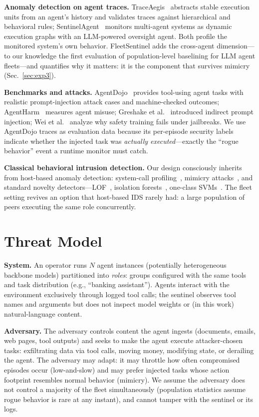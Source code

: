 \documentclass[conference]{IEEEtran}
\newcommand{\sys}{FleetSentinel}
\begin{document}
\textbf{Anomaly detection on agent traces.} TraceAegis~\cite{traceaegis2025} abstracts stable execution units from an agent's history and validates traces against hierarchical and behavioral rules; SentinelAgent~\cite{sentinelagent2025} monitors multi-agent systems as dynamic execution graphs with an LLM-powered oversight agent. Both profile the monitored system's own behavior. \sys{} adds the cross-agent dimension---to our knowledge the first evaluation of population-level baselining for LLM agent fleets---and quantifies why it matters: it is the component that survives mimicry (Sec.~\ref{sec:exp3}).

\textbf{Benchmarks and attacks.} AgentDojo~\cite{debenedetti2024agentdojo} provides tool-using agent tasks with realistic prompt-injection attack cases and machine-checked outcomes; AgentHarm~\cite{andriushchenko2025agentharm} measures agent misuse; Greshake et al.~\cite{greshake2023} introduced indirect prompt injection; Wei et al.~\cite{wei2023jailbroken} analyze why safety training fails under jailbreaks. We use AgentDojo traces as evaluation data because its per-episode security labels indicate whether the injected task was \emph{actually executed}---exactly the ``rogue behavior'' event a runtime monitor must catch.

\textbf{Classical behavioral intrusion detection.} Our design consciously inherits from host-based anomaly detection: system-call profiling~\cite{forrest1996sense}, mimicry attacks~\cite{wagner2002mimicry}, and standard novelty detectors---LOF~\cite{breunig2000lof}, isolation forests~\cite{liu2008isolation}, one-class SVMs~\cite{scholkopf2001estimating}. The fleet setting revives an option that host-based IDS rarely had: a large population of peers executing the same role concurrently.

\section{Threat Model}\label{sec:threat}
\textbf{System.} An operator runs $N$ agent instances (potentially heterogeneous backbone models) partitioned into \emph{roles}: groups configured with the same tools and task distribution (e.g., ``banking assistant''). Agents interact with the environment exclusively through logged tool calls; the sentinel observes tool names and arguments but does not inspect model weights or (in this work) natural-language content.

\textbf{Adversary.} The adversary controls content the agent ingests (documents, emails, web pages, tool outputs) and seeks to make the agent execute attacker-chosen tasks: exfiltrating data via tool calls, moving money, modifying state, or derailing the agent. The adversary may adapt: it may throttle how often compromised episodes occur (low-and-slow) and may prefer injected tasks whose action footprint resembles normal behavior (mimicry). We assume the adversary does not control a majority of the fleet simultaneously (population statistics assume rogue behavior is rare at any instant), and cannot tamper with the sentinel or its logs.
\end{document}

